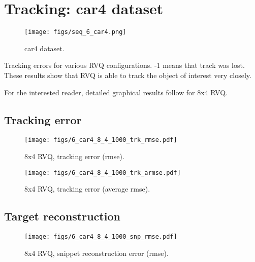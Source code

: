 \clearpage
\newpage
\section{Tracking: car4 dataset} 
								\begin{figure}[h!]
								\centering
								\texttt{[image: figs/seq\_6\_car4.png]}
								\caption{car4 dataset.}
								\label{fig:seq_4_car4}
								\end{figure}



\begin{table}[h]
\centering

\caption{Tracking errors for various RVQ configurations.  -1 means that track was lost.  These results show that RVQ is able to track the object of interest very closely.}
\end{table}

For the interested reader, detailed graphical results follow for 8x4 RVQ.

\clearpage
\newpage
\subsection{Tracking error}

								\begin{figure}[h!]
								\centering
								\texttt{[image: figs/6\_car4\_8\_4\_1000\_trk\_rmse.pdf]}
								\caption{8x4 RVQ, tracking error (rmse).}
								\label{fig:6_car4_8_4_1000_trk_rmse}
								\end{figure}


								\begin{figure}[h!]
								\centering
								\texttt{[image: figs/6\_car4\_8\_4\_1000\_trk\_armse.pdf]}
								\caption{8x4 RVQ, tracking error (average rmse).}
								\label{fig:6_car4_8_4_1000_trk_avg_rmse}
								\end{figure}

\clearpage
\newpage
\subsection{Target reconstruction}

								\begin{figure}[h!]
								\centering
								\texttt{[image: figs/6\_car4\_8\_4\_1000\_snp\_rmse.pdf]}
								\caption{8x4 RVQ, snippet reconstruction error (rmse).}
								\label{fig:6_car4_8_4_1000_snp_rmse}
								\end{figure}


